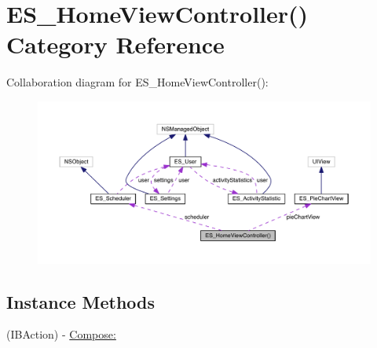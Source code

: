 \hypertarget{category_e_s___home_view_controller_07_08}{\section{E\+S\+\_\+\+Home\+View\+Controller() Category Reference}
\label{category_e_s___home_view_controller_07_08}
}


Collaboration diagram for E\+S\+\_\+\+Home\+View\+Controller()\+:\nopagebreak
\begin{figure}[H]
\begin{center}
\leavevmode
\includegraphics[width=350pt]{d6/dd7/category_e_s___home_view_controller_07_08__coll__graph}
\end{center}
\end{figure}
\subsection*{Instance Methods}
\begin{DoxyCompactItemize}
\item 
(I\+B\+Action) -\/ \hyperlink{category_e_s___home_view_controller_07_08_a602eaa5fb2ccb1e810e779aca79ff1df}{Compose\+:}
\end{DoxyCompactItemize}
